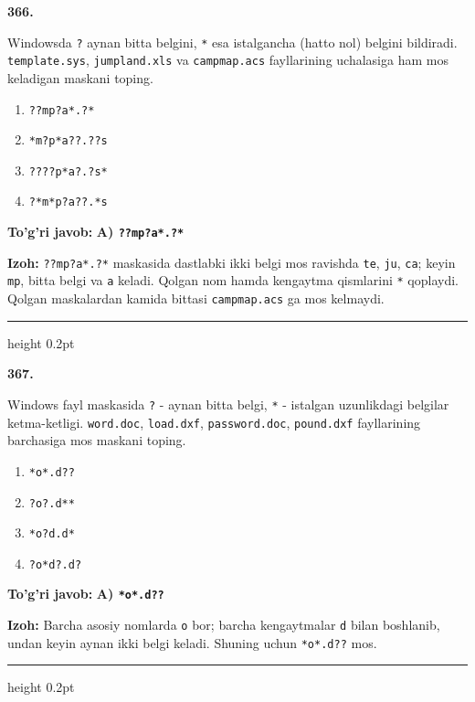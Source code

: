 \documentclass[10pt,a4paper]{article}
\begin{document}
{\bfseries\sffamily\color{ink} 366.}
\par
Windowsda \texttt{?} aynan bitta belgini, \texttt{*} esa istalgancha (hatto nol) belgini bildiradi. \texttt{template.sys}, \texttt{jumpland.xls} va \texttt{campmap.acs} fayllarining uchalasiga ham mos keladigan maskani toping.
\begin{enumerate}[label=\Alph*),leftmargin=9mm]
\item \texttt{??mp?a*.?*}
\item \texttt{*m?p*a??.??s}
\item \texttt{????p*a?.?s*}
\item \texttt{?*m*p?a??.*s}
\end{enumerate}
\begin{tcolorbox}[enhanced,breakable,colback=teal!4,colframe=teal!60!black,boxrule=0.45pt,arc=1.2mm,left=2.7mm,right=2.7mm,top=1.8mm,bottom=1.8mm,before skip=2mm,after skip=2mm]
{\bfseries\sffamily\color{teal}To'g'ri javob:} \textbf{A) \texttt{??mp?a*.?*}}
\par\smallskip
{\bfseries Izoh:} \texttt{??mp?a*.?*} maskasida dastlabki ikki belgi mos ravishda \texttt{te}, \texttt{ju}, \texttt{ca}; keyin \texttt{mp}, bitta belgi va \texttt{a} keladi. Qolgan nom hamda kengaytma qismlarini \texttt{*} qoplaydi. Qolgan maskalardan kamida bittasi \texttt{campmap.acs} ga mos kelmaydi.
\end{tcolorbox}
\vspace{2mm}\hrule height 0.2pt\vspace{3mm}

{\bfseries\sffamily\color{ink} 367.}
\par
Windows fayl maskasida \texttt{?} - aynan bitta belgi, \texttt{*} - istalgan uzunlikdagi belgilar ketma-ketligi. \texttt{word.doc}, \texttt{load.dxf}, \texttt{password.doc}, \texttt{pound.dxf} fayllarining barchasiga mos maskani toping.
\begin{enumerate}[label=\Alph*),leftmargin=9mm]
\item \texttt{*o*.d??}
\item \texttt{?o?.d**}
\item \texttt{*o?d.d*}
\item \texttt{?o*d?.d?}
\end{enumerate}
\begin{tcolorbox}[enhanced,breakable,colback=teal!4,colframe=teal!60!black,boxrule=0.45pt,arc=1.2mm,left=2.7mm,right=2.7mm,top=1.8mm,bottom=1.8mm,before skip=2mm,after skip=2mm]
{\bfseries\sffamily\color{teal}To'g'ri javob:} \textbf{A) \texttt{*o*.d??}}
\par\smallskip
{\bfseries Izoh:} Barcha asosiy nomlarda \texttt{o} bor; barcha kengaytmalar \texttt{d} bilan boshlanib, undan keyin aynan ikki belgi keladi. Shuning uchun \texttt{*o*.d??} mos.
\end{tcolorbox}
\vspace{2mm}\hrule height 0.2pt\vspace{3mm}
\end{document}
